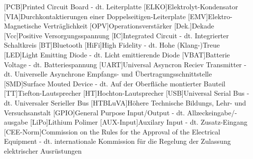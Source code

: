 
\begin{acronym}[ACRONYM]
[PCB]{Printed Circuit Board - dt. Leiterplatte}
[ELKO]{Elektrolyt-Kondensator}
[VIA]{Durchkontaktierungen einer Doppelseitigen-Leiterplate}
[EMV]{Elektro-Magnetische Verträglichkeit}
[OPV]{Operationsverstärker}
[Dek.]{Dekade}
[Vcc]{Positive Versorgungsspannung}
[IC]{Integrated Circuit - dt. Integrierter Schaltkreis}
[BT]{Bluetooth}
[HiFi]{High Fidelity - dt. Hohe (Klang-)Treue}
[LED]{Light Emitting Diode - dt. Licht emittierende Diode}
[VBAT]{Batterie Voltage - dt. Batteriespannung}
[UART]{Universal Asyncron Reciev Transmitter - dt. Universelle Asynchrone Empfangs- und Übertragungsschnittstelle}
[SMD]{Surface Mouted Device - dt. Auf der Oberfläche montierter Bauteil}
[TT]{Tiefton-Lautsprecher}
[HT]{Hochton-Lautsprecher}
[USB]{Universal Serial Bus - dt. Universaler Serieller Bus}
[HTBLuVA]{Höhere Technische Bildungs, Lehr- und Versuchsanstalt}
[GPIO]{General Purpose Input/Output - dt. Allzeckeingabe/-ausgabe}
[LiPo]{Lithium Polimer}
[AUX-Input]{Auxilary Input - dt. Zusatz-Eingang}
[CEE-Norm]{Commission on the Rules for the Approval of the Electrical Equipment - dt. internationale Kommission für die Regelung der Zulassung elektrischer Ausrüstungen}



\end{acronym}\newpage

